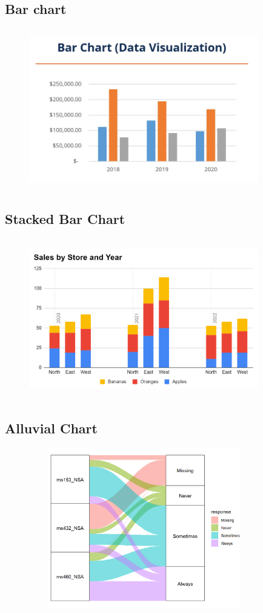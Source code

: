 \documentclass[12pt]{article}
\begin{document}
\subsection*{Bar chart}
\begin{figure}[h]
    \centering
    \includegraphics[width=10cm, height=7cm]{bar-charts.png}
    \centering
\end{figure}

\subsection*{Stacked Bar Chart}
\begin{figure}[h]
    \centering
    \includegraphics[width=10cm, height=7cm]{clusterstack1.png}
    \centering
\end{figure}

\newpage

\subsection*{Alluvial Chart}
\begin{figure}[h]
    \centering
    \includegraphics[width=10cm, height=7cm]{alluvial-plot-quintic.png}
    \centering
\end{figure}
\end{document}
